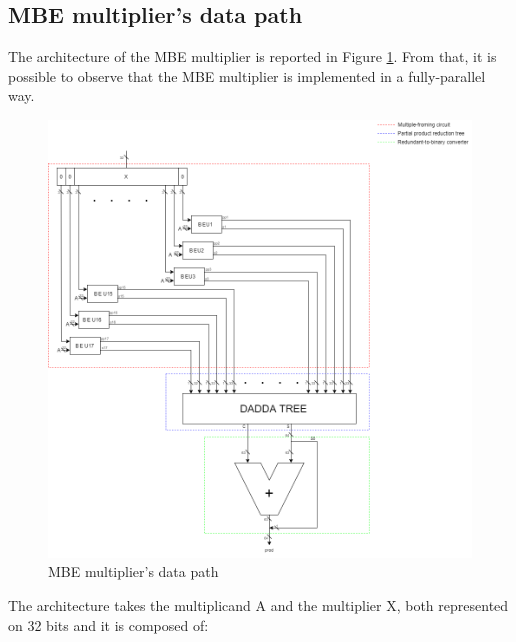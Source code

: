 \documentclass[a4paper, titlepage]{article}
\begin{document}
\subsection{MBE multiplier's data path}
The architecture of the MBE multiplier is reported in Figure \ref{fig:datapath MBE}. From that, it is possible to observe that the MBE multiplier is implemented in a fully-parallel way. 


\begin{figure}[htp]
\centering
\includegraphics[scale=0.45]{Datapath_MBE_multiplier.png}
	\caption{MBE multiplier's data path }
	\label{fig:datapath MBE}
\end{figure}
\noindent
\newline
The architecture takes the multiplicand A and the multiplier X, both represented on 32 bits and it is composed of:
\end{document}
